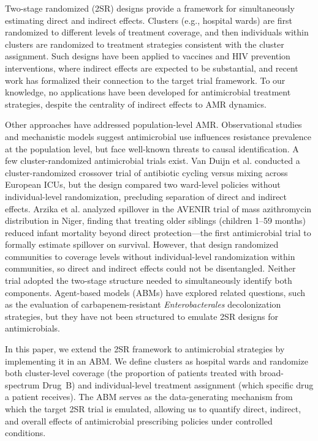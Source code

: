 \documentclass[12pt]{article}
\begin{document}
Two-stage randomized (2SR) designs provide a framework for simultaneously estimating direct and indirect effects.\cite{hudgens_toward_2008} Clusters (e.g., hospital wards) are first randomized to different levels of treatment coverage, and then individuals within clusters are randomized to treatment strategies consistent with the cluster assignment. Such designs have been applied to vaccines and HIV prevention interventions, where indirect effects are expected to be substantial,\cite{buchanan_disseminated_2021} and recent work has formalized their connection to the target trial framework.\cite{murray_emulating_2021} To our knowledge, no applications have been developed for antimicrobial treatment strategies, despite the centrality of indirect effects to AMR dynamics.

Other approaches have addressed population-level AMR. Observational studies and mechanistic models suggest antimicrobial use influences resistance prevalence at the population level,\cite{pham_characterizing_2025,olesen_role_2020} but face well-known threats to causal identification. A few cluster-randomized antimicrobial trials exist. Van Duijn et al.\cite{duijn_effects_2018} conducted a cluster-randomized crossover trial of antibiotic cycling versus mixing across European ICUs, but the design compared two ward-level policies without individual-level randomization, precluding separation of direct and indirect effects. Arzika et al.\cite{arzika_spillover_2025} analyzed spillover in the AVENIR trial of mass azithromycin distribution in Niger, finding that treating older siblings (children 1--59 months) reduced infant mortality beyond direct protection---the first antimicrobial trial to formally estimate spillover on survival. However, that design randomized communities to coverage levels without individual-level randomization within communities, so direct and indirect effects could not be disentangled. Neither trial adopted the two-stage structure needed to simultaneously identify both components. Agent-based models (ABMs) have explored related questions, such as the evaluation of carbapenem-resistant \textit{Enterobacterales} decolonization strategies,\cite{toth_economic_2021} but they have not been structured to emulate 2SR designs for antimicrobials.

In this paper, we extend the 2SR framework to antimicrobial strategies by implementing it in an ABM. We define clusters as hospital wards and randomize both cluster-level coverage (the proportion of patients treated with broad-spectrum Drug~B) and individual-level treatment assignment (which specific drug a patient receives). The ABM serves as the data-generating mechanism from which the target 2SR trial is emulated, allowing us to quantify direct, indirect, and overall effects of antimicrobial prescribing policies under controlled conditions.
\end{document}
